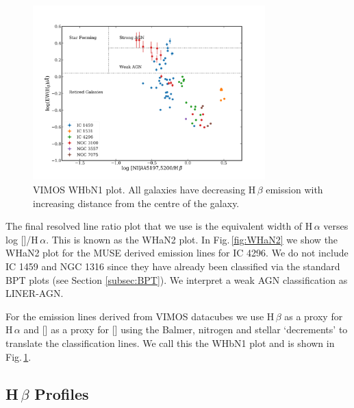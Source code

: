 		\begin{figure}
			\centering
			\includegraphics[width=0.8\textwidth]{chapter5/WHbN1.png}
			\caption[VIMOS WHbN1 plot]{VIMOS WHbN1 plot. All galaxies have decreasing H\,$\beta$ emission with increasing distance from the centre of the galaxy.}
			\label{fig:WHbN1}
		\end{figure}

		The final resolved line ratio plot that we use is the equivalent width of H\,$\alpha$ verses log []/H\,$\alpha$. This is known as the WHaN2 plot. In Fig.\,\ref{fig:WHaN2} we show the WHaN2 plot for the MUSE derived emission lines for IC 4296. We do not include IC 1459 and NGC 1316 since they have already been classified via the standard BPT plots (see Section \ref{subsec:BPT}). We interpret a weak AGN classification as LINER-AGN.

		For the emission lines derived from VIMOS datacubes we use H\,$\beta$ as a proxy for H\,$\alpha$ and [] as a proxy for [] using the Balmer, nitrogen and stellar `decrements' to translate the classification lines. We call this the WHbN1 plot and is shown in Fig.\,\ref{fig:WHbN1}.

		



	\subsection{H\,$\beta$ Profiles}
		\label{subsec:Hb}

